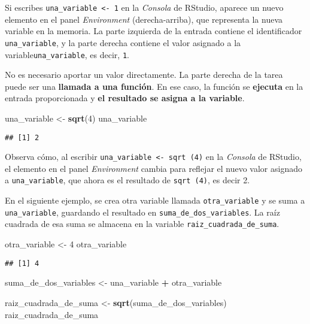 \documentclass[
]{book}
\newenvironment{Shaded}{\begin{snugshade}}{\end{snugshade}}
\newcommand{\DecValTok}[1]{\textcolor[rgb]{0.00,0.00,0.81}{#1}}
\newcommand{\KeywordTok}[1]{\textcolor[rgb]{0.13,0.29,0.53}{\textbf{#1}}}
\newcommand{\NormalTok}[1]{#1}
\newcommand{\OperatorTok}[1]{\textcolor[rgb]{0.81,0.36,0.00}{\textbf{#1}}}
\newcommand{\StringTok}[1]{\textcolor[rgb]{0.31,0.60,0.02}{#1}}
\begin{document}
Si escribes \texttt{una\_variable\ \textless{}-\ 1} en la \emph{Consola} de RStudio, aparece un nuevo elemento en el panel \emph{Environment} (derecha-arriba), que representa la nueva variable en la memoria. La parte izquierda de la entrada contiene el identificador \texttt{una\_variable}, y la parte derecha contiene el valor asignado a la variable\texttt{una\_variable}, es decir, \texttt{1}.

No es necesario aportar un valor directamente. La parte derecha de la tarea puede ser una \textbf{llamada a una función}. En ese caso, la función se \textbf{ejecuta} en la entrada proporcionada y \textbf{el resultado se asigna a la variable}.

\begin{Shaded}
\begin{Highlighting}[]
\NormalTok{una_variable <-}\StringTok{ }\KeywordTok{sqrt}\NormalTok{(}\DecValTok{4}\NormalTok{)}
\NormalTok{una_variable}
\end{Highlighting}
\end{Shaded}

\begin{verbatim}
## [1] 2
\end{verbatim}

Observa cómo, al escribir \texttt{una\_variable\ \textless{}-\ sqrt\ (4)} en la \emph{Consola} de RStudio, el elemento en el panel \emph{Environment} cambia para reflejar el nuevo valor asignado a \texttt{una\_variable}, que ahora es el resultado de \texttt{sqrt\ (4)}, es decir 2.

En el siguiente ejemplo, se crea otra variable llamada \texttt{otra\_variable} y se suma a \texttt{una\_variable}, guardando el resultado en \texttt{suma\_de\_dos\_variables}. La raíz cuadrada de esa suma se almacena en la variable \texttt{raiz\_cuadrada\_de\_suma}.

\begin{Shaded}
\begin{Highlighting}[]
\NormalTok{otra_variable <-}\StringTok{ }\DecValTok{4}
\NormalTok{otra_variable}
\end{Highlighting}
\end{Shaded}

\begin{verbatim}
## [1] 4
\end{verbatim}

\begin{Shaded}
\begin{Highlighting}[]
\NormalTok{suma_de_dos_variables <-}\StringTok{ }\NormalTok{una_variable }\OperatorTok{+}\StringTok{ }\NormalTok{otra_variable}

\NormalTok{raiz_cuadrada_de_suma <-}\StringTok{ }\KeywordTok{sqrt}\NormalTok{(suma_de_dos_variables)}
\NormalTok{raiz_cuadrada_de_suma}
\end{Highlighting}
\end{Shaded}
\end{document}
